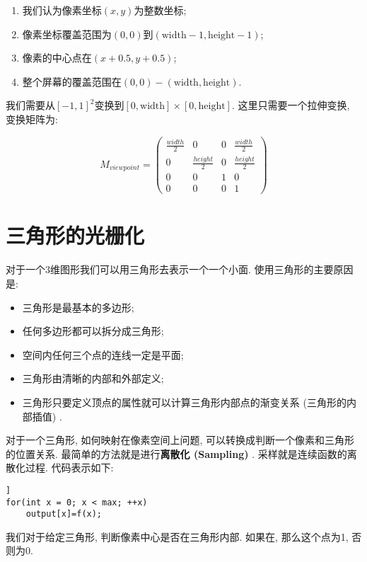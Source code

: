 \documentclass[openany]{progbookcn}
\begin{document}
\begin{enumerate}
	\item 我们认为像素坐标$(x,y)$为整数坐标; 
	\item 像素坐标覆盖范围为$(0,0)$到$(\text{width}-1,\text{height}-1)$; 
	\item 像素的中心点在$(x+0.5,y+0.5)$; 
	\item 整个屏幕的覆盖范围在$(0,0)-(\text{width}, \text{height})$.
\end{enumerate}

我们需要从$[-1,1]^2$变换到$[0,\text{width}]\times[0,\text{height}]$. 这里只需要一个拉伸变换, 变换矩阵为: 

\begin{equation}
	M_{viewpoint}=\begin{pmatrix}
		\frac{width}{2} &0&0&\frac{width}{2}\\
		0&\frac{height}{2}&0&\frac{height}{2}\\
		0&0&1&0\\
		0&0&0&1
	\end{pmatrix}
\end{equation}

\section{三角形的光栅化}

对于一个3维图形我们可以用三角形去表示一个一个小面. 使用三角形的主要原因是: 

\begin{itemize}
	\item 三角形是最基本的多边形; 
	\item 任何多边形都可以拆分成三角形; 
	\item 空间内任何三个点的连线一定是平面; 
	\item 三角形由清晰的内部和外部定义; 
	\item 三角形只要定义顶点的属性就可以计算三角形内部点的渐变关系 (三角形的内部插值) . 
\end{itemize}

对于一个三角形, 如何映射在像素空间上问题, 可以转换成判断一个像素和三角形的位置关系. 最简单的方法就是进行\textbf{离散化 (Sampling) }. 采样就是连续函数的离散化过程. 代码表示如下: 

\begin{lstlisting}]
for(int x = 0; x < max; ++x)
	output[x]=f(x);
\end{lstlisting}
我们对于给定三角形, 判断像素中心是否在三角形内部. 如果在, 那么这个点为1, 否则为0.
\end{document}
